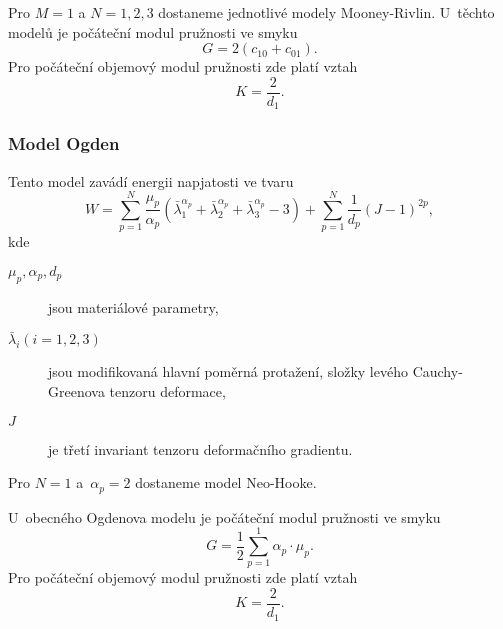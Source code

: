 Pro $M=1$ a $N= 1,2,3$ dostaneme jednotlivé modely Mooney-Rivlin.
U~těchto modelů je počáteční modul pružnosti ve smyku
\begin{equation}
	G = 2 \left(c_{10} + c_{01}\right).
\end{equation}
Pro počáteční objemový modul pružnosti zde platí vztah
\begin{equation}
	K = \frac{2}{d_1}.
\end{equation}

\subsubsection{Model Ogden}\label{sec:model-ogden}
Tento model zavádí energii napjatosti ve tvaru
\begin{equation}
	W
	= \sum\limits_{p=1}^N \frac{\mu_p}{\alpha_p} \left( \bar{\lambda}_1^{\alpha_p} + \bar{\lambda}_2^{\alpha_p} + \bar{\lambda}_3^{\alpha_p} - 3\right)
	+ \sum\limits_{p=1}^N \frac{1}{d_p} \left(J - 1\right)^{2p},
\end{equation}
kde
\begin{description}
	\item[$\mu_p, \alpha_p, d_p$] jsou materiálové parametry,
	\item[$\bar{\lambda}_i (i=1,2,3)$] jsou modifikovaná hlavní poměrná protažení, složky levého Cauchy-Greenova tenzoru deformace,
	\item[$J$] je třetí invariant tenzoru deformačního gradientu.
\end{description}

Pro $N = 1$ a~$\alpha_p = 2$ dostaneme model Neo-Hooke.

U~obecného Ogdenova modelu je počáteční modul pružnosti ve smyku
\begin{equation}
	G = \frac{1}{2} \sum\limits_{p=1}^1 \alpha_p \cdot \mu_p.
\end{equation}
Pro počáteční objemový modul pružnosti zde platí vztah
\begin{equation}
	K = \frac{2}{d_1}.
\end{equation}

